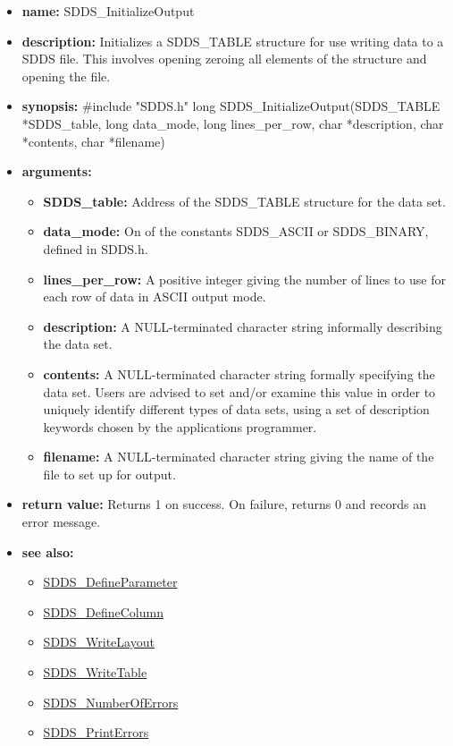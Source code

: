 \documentclass[11pt]{article}
\newcommand{\progref}[1]{\hyperref{SDDS_#1}{{\tt SDDS\_#1} (}{)}{SDDS_#1}}
\begin{document}
\begin{itemize}
\item {\bf name:}\newline
SDDS\_InitializeOutput
\item {\bf description:}\newline
Initializes a SDDS\_TABLE structure for use writing data to a SDDS file. This involves opening zeroing all elements of the structure and opening the file.
\item {\bf synopsis:} \#include "SDDS.h"\newline
long SDDS\_InitializeOutput(SDDS\_TABLE *SDDS\_table, long data\_mode, long lines\_per\_row, char *description, char *contents, char *filename)
\item {\bf arguments:}
\begin{itemize}
\item {\bf SDDS\_table:} Address of the SDDS\_TABLE structure for the data set.
\item {\bf data\_mode:} On of the constants SDDS\_ASCII or SDDS\_BINARY, defined in  SDDS.h.
\item {\bf lines\_per\_row:} A positive integer giving the number of lines to use for each row of data in ASCII output mode.
\item {\bf description:} A NULL-terminated character string informally describing the data set.
\item {\bf contents:} A NULL-terminated character string formally specifying the data set. Users are advised to set and/or examine this value in order to uniquely identify different types of data sets, using a set of description keywords chosen by the applications programmer.
\item {\bf filename:} A NULL-terminated character string giving the name of the file to set up for output.
\end{itemize}
\item {\bf return value:}\newline
Returns 1 on success. On failure, returns 0 and records an error message.
\item {\bf see also:}
\begin{itemize}
\item \progref{DefineParameter}
\item \progref{DefineColumn}
\item \progref{WriteLayout}
\item \progref{WriteTable}
\item \progref{NumberOfErrors}
\item \progref{PrintErrors}
\end{itemize}
\end{itemize}
\end{document}
